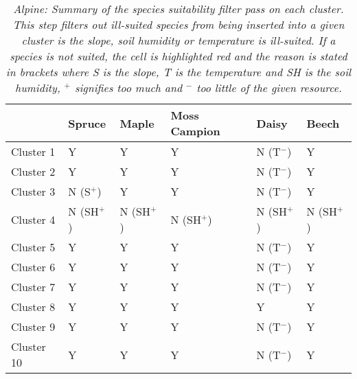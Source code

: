 \begin{table}[htb!]
  \centering
	    \begin{tabular}{|p{2cm}|p{2.5cm}|p{2.5cm}|p{2.5cm}|p{2.5cm}|p{2.5cm}|}
		\hline	
		&  \textbf{Spruce} & \textbf{Maple} & \textbf{Moss Campion} & \textbf{Daisy} & \textbf{Beech}\\
		\hline	
		Cluster 1 & 
		Y & 
		Y & 
		Y & 
		\cellcolor{color_red}N (T$^{-}$) & 
		Y \\
		\hline	
		Cluster 2 & 
		Y & 
		Y & 
		Y & 
		\cellcolor{color_red}N (T$^{-}$) & 
		Y \\
		\hline	
		Cluster 3 & 
		\cellcolor{color_red}N (S$^{+}$) & 
		Y & 
		Y & 
		\cellcolor{color_red}N (T$^{-}$) & 
		Y \\
		\hline	
		Cluster 4 & 
		\cellcolor{color_red}N (SH$^{+}$) & 
		\cellcolor{color_red}N (SH$^{+}$) & 
		\cellcolor{color_red}N (SH$^{+}$) & 
		\cellcolor{color_red}N (SH$^{+}$) & 
		\cellcolor{color_red}N (SH$^{+}$) \\
		\hline	
		Cluster 5 & 
		Y & 
		Y & 
		Y & 
		\cellcolor{color_red}N (T$^{-}$) & 
		Y \\
		\hline	
		Cluster 6 & 
		Y & 
		Y & 
		Y & 
		\cellcolor{color_red}N (T$^{-}$) & 
		Y \\
		\hline	
		Cluster 7 & 
		Y & 
		Y & 
		Y & 
		\cellcolor{color_red}N (T$^{-}$) & 
		Y \\
		\hline	
		Cluster 8 & 
		Y & 
		Y & 
		Y & 
		Y &
		Y \\
		\hline	
		Cluster 9 & 
		Y & 
		Y & 
		Y & 
		\cellcolor{color_red}N (T$^{-}$) & 
		Y \\
		\hline	
		Cluster 10 &
		Y & 
		Y & 
		Y & 
		\cellcolor{color_red}N (T$^{-}$) & 
		Y \\
		\hline	
		\end{tabular}
		\caption{\textit{Alpine: Summary of the species suitability filter pass on each cluster. This step filters out ill-suited species from being inserted into a given cluster is the slope, soil humidity or temperature is ill-suited. If a species is not suited, the cell is highlighted red and the reason is stated in brackets where \textit{S} is the slope, \textit{T} is the temperature and \textit{SH} is the soil humidity, $^{+}$ signifies too much and $^{-}$ too little of the given resource.}}
	  \label{tab:results_alpine_species_suitability}
\end{table}

